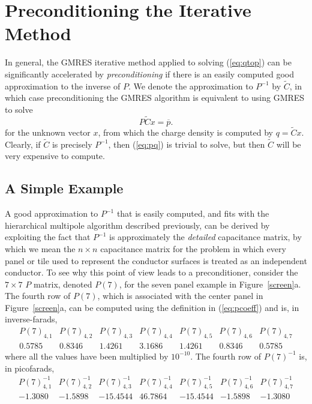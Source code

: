 \section{Preconditioning the Iterative Method}
\label{precon}

In general, the GMRES iterative method applied to solving
(\ref{eq:qtop}) can be significantly accelerated by {\it
preconditioning} if there is an easily computed good approximation to the
inverse of $ P $.  We denote the approximation to $ P^{-1} $ by $
\tilde{C} $, in which case preconditioning the GMRES algorithm is
equivalent to using GMRES to solve
\begin{equation}
P \tilde{C} x = \overline{p}.
\label{eq:pq}
\end{equation}
for the unknown vector $ x $, from which the charge density is
computed by $ q = \tilde{C} x $.  Clearly, if $ \tilde{C} $ is
precisely $ P^{-1} $, then (\ref{eq:pq}) is trivial to solve, but then
$ \tilde{C} $ will be very expensive to compute.

\subsection{A Simple Example}


A good approximation to $ P^{-1} $ that is easily computed, and fits
with the hierarchical multipole algorithm described previously, can be
derived by exploiting the fact that $ P^{-1} $ is approximately the
{\it detailed} capacitance matrix, by which we mean
the $ n \times n $ capacitance matrix for the problem in which
every panel or tile used to represent the conductor surfaces is
treated as an independent conductor.  To see why this point of view
leads to a preconditioner, consider the $ 7 \times 7 $ $ P $
matrix, denoted $P(7)$, for the seven panel example 
in Figure~\ref{screen}a.  The fourth 
row of $ P(7) $, which is associated with the center panel in 
Figure~\ref{screen}a, can be computed
using the definition in (\ref{eq:pcoeff}) and is, in inverse-farads,
\begin{equation}
\begin{array}{ccccccc}
P(7)_{4,1} & P(7)_{4,2} & P(7)_{4,3} &P(7)_{4,4} & 
P(7)_{4,5} & P(7)_{4,6} & P(7)_{4,7}\\
0.5785 & 0.8346 & 1.4261 & 3.1686 & 1.4261 & 0.8346 & 0.5785
\end{array}
\label{eq:panel7}
\end{equation}
where all the values have been multiplied by $10^{-10}$.
The fourth row of $ P(7)^{-1} $ is, in picofarads,
\begin{equation}
\begin{array}{ccccccc}
P(7)^{-1}_{4,1} & P(7)^{-1}_{4,2} & P(7)^{-1}_{4,3} & 
P(7)^{-1}_{4,4} & P(7)^{-1}_{4,5} & P(7)^{-1}_{4,6} & 
P(7)^{-1}_{4,7} \\ 
-1.3080 &  -1.5898 & -15.4544 &  46.7864 & -15.4544 &  -1.5898 &  -1.3080
\end{array}
\label{invpanel}
\end{equation}

